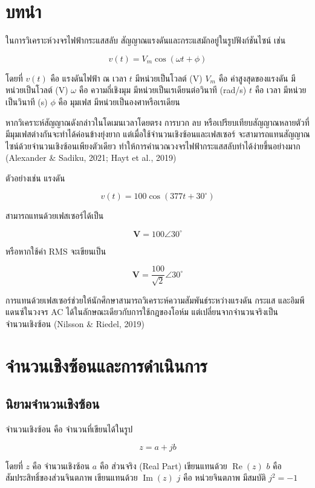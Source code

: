 \section{บทนำ}

ในการวิเคราะห์วงจรไฟฟ้ากระแสสลับ สัญญาณแรงดันและกระแสมักอยู่ในรูปฟังก์ชันไซน์ เช่น

\[
v(t)=V_m\cos(\omega t+\phi)
\]

โดยที่  
$v(t)$ คือ แรงดันไฟฟ้า ณ เวลา $t$ มีหน่วยเป็นโวลต์ (V)  
$V_m$ คือ ค่าสูงสุดของแรงดัน มีหน่วยเป็นโวลต์ (V)  
$\omega$ คือ ความถี่เชิงมุม มีหน่วยเป็นเรเดียนต่อวินาที (rad/s)  
$t$ คือ เวลา มีหน่วยเป็นวินาที (s)  
$\phi$ คือ มุมเฟส มีหน่วยเป็นองศาหรือเรเดียน

หากวิเคราะห์สัญญาณดังกล่าวในโดเมนเวลาโดยตรง การบวก ลบ หรือเปรียบเทียบสัญญาณหลายตัวที่มีมุมเฟสต่างกันจะทำได้ค่อนข้างยุ่งยาก แต่เมื่อใช้จำนวนเชิงซ้อนและเฟสเซอร์ จะสามารถแทนสัญญาณไซน์ด้วยจำนวนเชิงซ้อนเพียงตัวเดียว ทำให้การคำนวณวงจรไฟฟ้ากระแสสลับทำได้ง่ายขึ้นอย่างมาก (Alexander \& Sadiku, 2021; Hayt et al., 2019)

ตัวอย่างเช่น แรงดัน

\[
v(t)=100\cos(377t+30^\circ)
\]

สามารถแทนด้วยเฟสเซอร์ได้เป็น

\[
\mathbf{V}=100\angle 30^\circ
\]

หรือหากใช้ค่า RMS จะเขียนเป็น

\[
\mathbf{V}=\frac{100}{\sqrt{2}}\angle 30^\circ
\]

การแทนด้วยเฟสเซอร์ช่วยให้นักศึกษาสามารถวิเคราะห์ความสัมพันธ์ระหว่างแรงดัน กระแส และอิมพีแดนซ์ในวงจร AC ได้ในลักษณะเดียวกับการใช้กฎของโอห์ม แต่เปลี่ยนจากจำนวนจริงเป็นจำนวนเชิงซ้อน (Nilsson \& Riedel, 2019)

\section{จำนวนเชิงซ้อนและการดำเนินการ}

\subsection{นิยามจำนวนเชิงซ้อน}

จำนวนเชิงซ้อน คือ จำนวนที่เขียนได้ในรูป

\[
z=a+jb
\]

โดยที่  
$z$ คือ จำนวนเชิงซ้อน  
$a$ คือ ส่วนจริง (Real Part) เขียนแทนด้วย $\operatorname{Re}(z)$  
$b$ คือ สัมประสิทธิ์ของส่วนจินตภาพ เขียนแทนด้วย $\operatorname{Im}(z)$  
$j$ คือ หน่วยจินตภาพ มีสมบัติ $j^2=-1$


